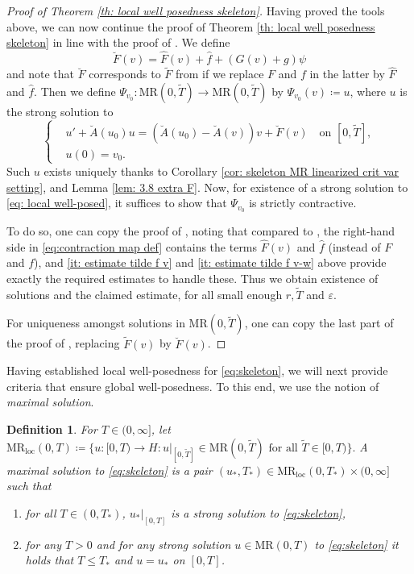 \documentclass{amsart}
\renewcommand{\MR}{\mathrm{MR}}
\newcommand{\<}{\langle}
\newcommand{\?}{\rangle}
\theoremstyle{plain}
\theoremstyle{remark}
\theoremstyle{plain}
\newtheorem{definition}[theorem]{Definition}
\numberwithin{equation}{section}
\newcommand{\eps}{\varepsilon}
\begin{document}
\begin{proof}[Proof of Theorem \ref{th: local well posedness skeleton}]
Having proved the tools above, we  can now continue the  proof of  
Theorem \ref{th: local well posedness skeleton} in line with the proof of \cite[Th.\ 3.7]{TV24}.  We define 
\[
\breve{F}(v)=\hat{F}(v)+\hat{f}+(G(v)+g)\psi 
\] 
and note that $\breve{F}$ corresponds to $\tilde{F}$ from \cite[\S3.2]{TV24} if we replace $F$ and $f$ in the latter by $\hat{F}$ and $\hat{f}$. 
Then we define $\Psi_{v_0}\colon \MR(0,\tilde{T})\to \MR(0,\tilde{T})$   by $\Psi_{v_0}(v)\coloneqq u$, where $u$ is the strong solution to
\begin{equation}\label{eq:contraction map def}
  \begin{cases}
    &u'+\breve{A}(u_0)u=(\breve{A}(u_0)-\breve{A}(v))v+\breve{F}(v) \quad \text{on } [0,\tilde{T}],\\
    &u(0)=v_0.
  \end{cases}
\end{equation}
Such $u$ exists uniquely thanks to Corollary \ref{cor: skeleton MR linearized crit var setting}, \cite[Lem.\ 3.8]{TV24} and Lemma \ref{lem: 3.8 extra F}. 
Now, for existence of a   strong solution to \eqref{eq: local well-posed}, it suffices to show that $\Psi_{v_0}$ is strictly contractive.

To do so, one can copy the proof of \cite[Th.\ 3.7]{TV24}, noting that compared to \cite[(3.12)]{TV24}, the right-hand side in \eqref{eq:contraction map def} contains the terms  $\hat{F}(v)$ and $\hat{f}$ (instead of $F$ and $f$), and \ref{it: estimate tilde f v} and \ref{it: estimate tilde f v-w} above provide exactly the required estimates to handle these. Thus we obtain existence of solutions and the claimed estimate, for all small enough $r,\tilde{T}$ and $\eps$.  

For uniqueness amongst solutions in $\MR(0,\tilde{T})$, one can copy the last part of the proof of \cite[Th.\ 3.7]{TV24}, replacing $\tilde{F}(v)$ by $\breve{F}(v)$. 
\end{proof}

Having established local well-posedness for \eqref{eq:skeleton}, we will next provide criteria that ensure global well-posedness. To this end, we use the notion of \emph{maximal solution}.

\begin{definition}\label{def: maximal solution}
For $T\in(0,\infty]$, let 
$\MR_{\mathrm{loc}}(0,T)\coloneqq \{u\colon [0,T)\to H: u|_{[0,\tilde{T}]}\in\MR(0,\tilde{T}) \text{ for all } \tilde{T}\in[0,T)\}.$ 
A \emph{maximal solution} to \eqref{eq:skeleton} is a pair $(u_*,T_*)\in \MR_{\mathrm{loc}}(0,T_*) \times (0,\infty]$  such that
\begin{enumerate}[label=(\roman*)]
  \item for all $T\in(0,T_*)$, $u_*|_{[0,T]}$ is a strong solution to \eqref{eq:skeleton},
  \item for any $T>0$ and for any strong solution $u\in\MR(0,T)$ to \eqref{eq:skeleton} it holds that $T\leq T_*$ and $u=u_*$ on $[0,T]$.
\end{enumerate}
\end{definition}
 
\end{document}
